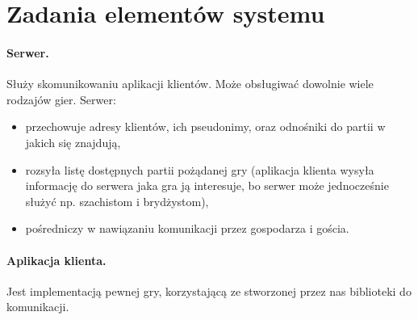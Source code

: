 \documentclass[a4paper, 12pt]{article}
\begin{document}
\section{Zadania elementów systemu}

\paragraph{Serwer.} Służy skomunikowaniu aplikacji klientów. Może obsługiwać dowolnie wiele rodzajów gier.
Serwer:

\begin{itemize}
 \item przechowuje adresy klientów, ich pseudonimy, oraz odnośniki do partii w jakich się znajdują,
 \item rozsyła listę dostępnych partii pożądanej gry (aplikacja klienta wysyła informację do serwera jaka gra ją interesuje, bo serwer może jednocześnie służyć np. szachistom i brydżystom),
 \item pośredniczy w nawiązaniu komunikacji przez gospodarza i gościa.
\end{itemize}

\paragraph{Aplikacja klienta.} Jest implementacją pewnej gry, korzystającą ze stworzonej przez nas biblioteki do komunikacji. 
\end{document}
